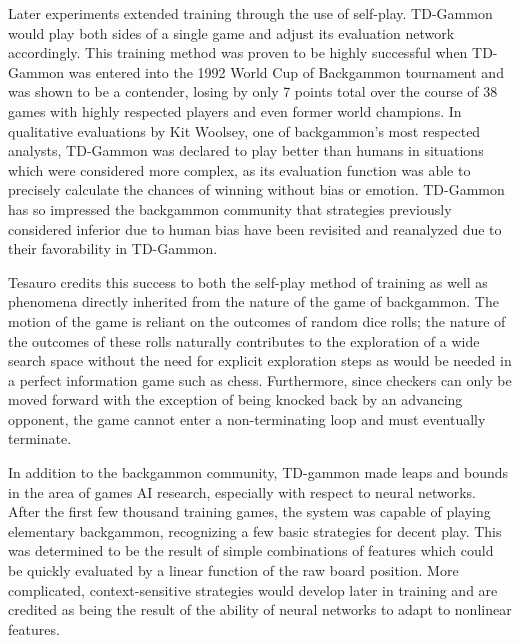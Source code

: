 Later experiments extended training through the use of self-play.
%
TD-Gammon would play both sides of a single game and adjust its evaluation
network accordingly.
%
This training method was proven to be highly successful when TD-Gammon was
entered into the 1992 World Cup of Backgammon tournament and was shown to be a
contender,
losing by only 7 points total over the course of 38 games with highly respected
players and even former world champions.
%
In qualitative evaluations by Kit Woolsey,
one of backgammon's most respected analysts,
TD-Gammon was declared to play better than humans in situations which were
considered more complex,
as its evaluation function was able to precisely
calculate the chances of winning without bias or emotion.
%
TD-Gammon has so impressed the backgammon community that strategies previously
considered inferior due to human bias have been revisited and reanalyzed due to
their favorability in TD-Gammon.

Tesauro credits this success to both the self-play method of training
as well as phenomena directly inherited from the nature of the game of
backgammon.
%
The motion of the game is reliant on the outcomes of random dice rolls;
the nature of the outcomes of these rolls naturally contributes to the
exploration of a wide search space without the need for explicit exploration
steps as would be needed in a perfect information game such as chess.
%
Furthermore,
since checkers can only be moved forward
with the exception of being knocked back by an advancing opponent,
the game cannot enter a non-terminating loop and must eventually
terminate.

In addition to the backgammon community,
TD-gammon made leaps and bounds in the area of games AI research,
especially with respect to neural networks.
%
After the first few thousand training games,
the system was capable of playing elementary backgammon,
recognizing a few basic strategies for decent play.
%
This was determined to be the result of simple combinations of features which
could be quickly evaluated by a linear function of the raw board position.
%
More complicated, context-sensitive strategies would develop later in training
and are credited as being the result of the ability of neural networks to adapt
to nonlinear features.


